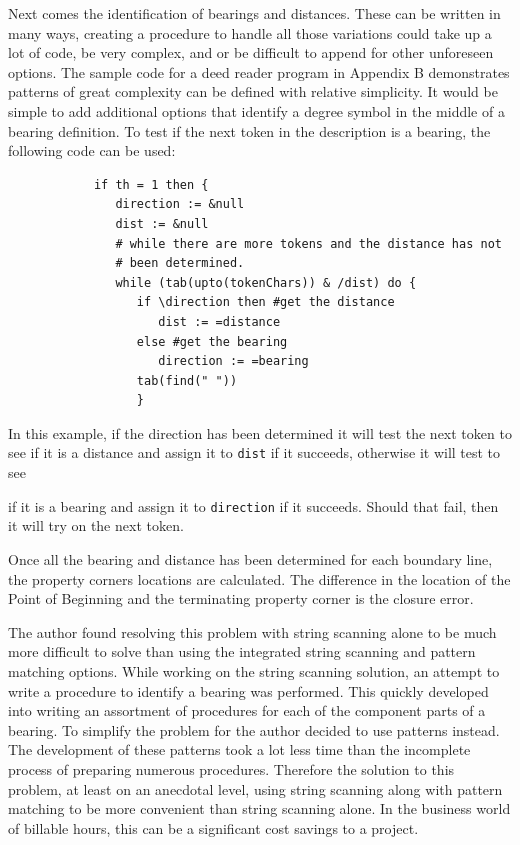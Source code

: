 \documentclass{article}
\begin{document}
Next comes the identification of bearings and distances.  These can be written in many ways, creating a  procedure to handle all those variations could take up a lot of code, be very complex, and or be difficult to append for other unforeseen options.  The sample code for a deed reader program in Appendix B demonstrates patterns of great complexity can be defined with relative simplicity.  It would be simple to add additional options that identify a degree symbol in the middle of a bearing definition.  To test if the next token in the description is a bearing, the following code can be used:\\
\begin{verbatim}
            if th = 1 then {
               direction := &null
               dist := &null 
               # while there are more tokens and the distance has not
               # been determined.
               while (tab(upto(tokenChars)) & /dist) do {
                  if \direction then #get the distance
                     dist := =distance 
                  else #get the bearing
                     direction := =bearing           
                  tab(find(" "))
                  }
\end{verbatim}
In this example, if the direction has been determined it will test the next token to see if it is a distance and assign it to \texttt{dist} if it succeeds, otherwise it will test to see 

\pagebreak \noindent
if it is a bearing and assign it to \texttt{direction} if it succeeds.  Should that fail, then it will try on the next token.

Once all the bearing and distance has been determined for each boundary line, the property corners locations are calculated.  The difference in the location of the Point of Beginning and the terminating property corner is the closure error.

The author found resolving this problem with string scanning alone to be much more difficult to solve than using the integrated string scanning and pattern matching options.  While working on the string scanning solution, an attempt to write a procedure to identify a bearing was performed.  This quickly developed into writing an assortment of procedures for each of the component parts of a bearing.  To simplify the problem for the author decided to use patterns instead.  The development of these patterns took a lot less time than the incomplete process of preparing numerous procedures.  Therefore the solution to this problem, at least on an anecdotal level, using string scanning along with pattern matching to be more convenient than string scanning alone.  In the business world of billable hours, this can be a significant cost savings to a project.
\end{document}
